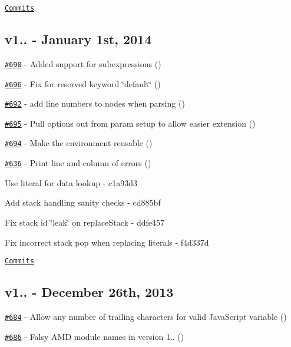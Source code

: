 \href{https://github.com/wycats/handlebars.js/compare/v1.3.0...v2.0.0-alpha.1}{\tt Commits}

\subsection*{v1.. -\/ January 1st, 2014}


\begin{DoxyItemize}
\item \href{https://github.com/wycats/handlebars.js/pull/690}{\tt \#690} -\/ Added support for subexpressions (\href{https://api.github.com/users/machty}{\tt })
\item \href{https://github.com/wycats/handlebars.js/pull/696}{\tt \#696} -\/ Fix for reserved keyword \char`\"{}default\char`\"{} (\href{https://api.github.com/users/nateirwin}{\tt })
\item \href{https://github.com/wycats/handlebars.js/pull/692}{\tt \#692} -\/ add line numbers to nodes when parsing (\href{https://api.github.com/users/fivetanley}{\tt })
\item \href{https://github.com/wycats/handlebars.js/pull/695}{\tt \#695} -\/ Pull options out from param setup to allow easier extension (\href{https://api.github.com/users/blakeembrey}{\tt })
\item \href{https://github.com/wycats/handlebars.js/pull/694}{\tt \#694} -\/ Make the environment reusable (\href{https://api.github.com/users/blakeembrey}{\tt })
\item \href{https://github.com/wycats/handlebars.js/issues/636}{\tt \#636} -\/ Print line and column of errors (\href{https://api.github.com/users/sgronblo}{\tt })
\item Use literal for data lookup -\/ c1a93d3
\item Add stack handling sanity checks -\/ cd885bf
\item Fix stack id \char`\"{}leak\char`\"{} on replace\+Stack -\/ ddfe457
\item Fix incorrect stack pop when replacing literals -\/ f4d337d
\end{DoxyItemize}

\href{https://github.com/wycats/handlebars.js/compare/v1.2.1...v1.3.0}{\tt Commits}

\subsection*{v1.. -\/ December 26th, 2013}


\begin{DoxyItemize}
\item \href{https://github.com/wycats/handlebars.js/pull/684}{\tt \#684} -\/ Allow any number of trailing characters for valid Java\+Script variable (\href{https://api.github.com/users/blakeembrey}{\tt })
\item \href{https://github.com/wycats/handlebars.js/pull/686}{\tt \#686} -\/ Falsy A\+MD module names in version 1.. (\href{https://api.github.com/users/kpdecker}{\tt })
\end{DoxyItemize}

